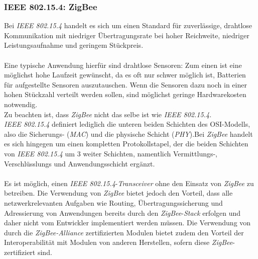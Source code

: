         \subsubsection{IEEE 802.15.4: ZigBee}

                Bei \emph{IEEE 802.15.4} handelt es sich um einen Standard für 
                zuverlässige, drahtlose Kommunikation mit niedriger Übertragungsrate
                bei hoher Reichweite, niedriger Leistungsaufnahme und geringem Stückpreis.\\
                \\
                Eine typische Anwendung hierfür sind drahtlose Sensoren: Zum einen
                ist eine möglichst hohe Laufzeit gewünscht, da es oft nur schwer
                möglich ist, Batterien für aufgestellte Sensoren auszutauschen.
                Wenn die Sensoren dazu noch in einer hohen Stückzahl verteilt werden
                sollen, sind möglichst geringe Hardwarekosten notwendig.
                \\
                Zu beachten ist, dass \emph{ZigBee} nicht das selbe ist wie \emph{IEEE 802.15.4.}\\
                \emph{IEEE 802.15.4} definiert lediglich die unteren beiden Schichten des
                OSI-Modells, also die Sicherungs- (\emph{MAC}) und die physische Schicht 
                (\emph{PHY}).Bei \emph{ZigBee} handelt es sich hingegen um einen kompletten Protokollstapel,
                der die beiden Schichten von \emph{IEEE 802.15.4} um 3 weiter Schichten,
                namentlich Vermittlungs-, Verschlüsslungs und Anwendungsschicht 
                ergänzt. \cite{zigbee_specification}   \\
                \\
                Es ist möglich, einen \emph{IEEE 802.15.4}-\emph{Transceiver} ohne den Einsatz
                von \emph{ZigBee} zu betreiben. Die Verwendung von \emph{ZigBee} bietet jedoch
                den Vorteil, dass alle netzwerkrelevanten Aufgaben wie Routing,
                Übertragungssicherung und Adressierung von Anwendungen bereits
                durch den \emph{ZigBee}-\emph{Stack} erfolgen und daher nicht vom Entwickler
                implementiert werden müssen. Die Verwendung von durch die
                \emph{ZigBee-Alliance} zertifizierten Modulen bietet zudem den
                Vorteil der Interoperabilität mit Modulen von anderen Herstellen,
                sofern diese \emph{ZigBee}-zertifiziert sind.

